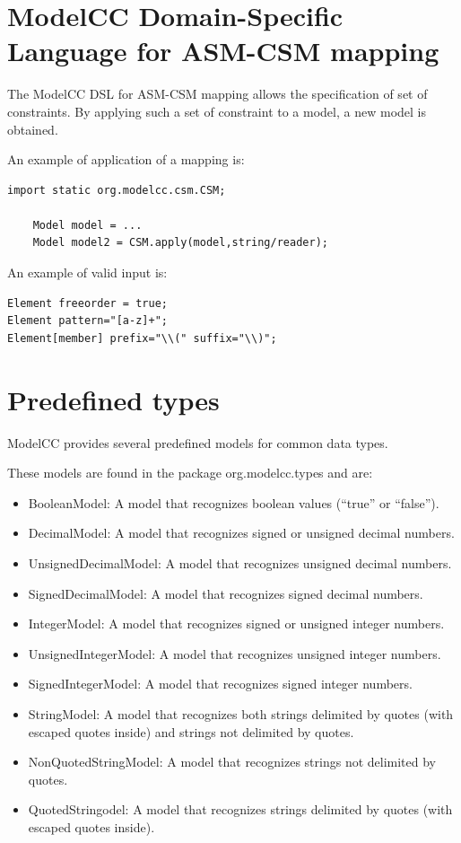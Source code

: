 \documentclass[a4paper,twoside,onecolumn]{article}
\newenvironment{colframe}{%
  \begin{Sbox} 
    \begin{minipage}{.8\columnwidth} 
}{%

  \end{minipage} 
  \end{Sbox} 
  \begin{center} 
    \fcolorbox{black}{MyGray}{\TheSbox} 
  \end{center} 
}
\begin{document}
\section{ModelCC Domain-Specific Language for ASM-CSM mapping} \label{sec:asmcsm}

The ModelCC DSL for ASM-CSM mapping allows the specification of set of constraints.
By applying such a set of constraint to a model, a new model is obtained.

An example of application of a mapping is:

\begin{colframe}
\begin{verbatim}
import static org.modelcc.csm.CSM;

    Model model = ...
    Model model2 = CSM.apply(model,string/reader);
\end{verbatim}
\end{colframe}

An example of valid input is:

\begin{colframe}
\begin{verbatim}
Element freeorder = true;
Element pattern="[a-z]+";
Element[member] prefix="\\(" suffix="\\)";
\end{verbatim}
\end{colframe}

\section{Predefined types} \label{sec:predefinedtypes}

ModelCC provides several predefined models for common data types.

These models are found in the package org.modelcc.types and are:

\begin{itemize}
\item BooleanModel: A model that recognizes boolean values (``true'' or ``false'').
\item DecimalModel: A model that recognizes signed or unsigned decimal numbers.
\item UnsignedDecimalModel: A model that recognizes unsigned decimal numbers.
\item SignedDecimalModel: A model that recognizes signed decimal numbers.
\item IntegerModel: A model that recognizes signed or unsigned integer numbers.
\item UnsignedIntegerModel: A model that recognizes unsigned integer numbers.
\item SignedIntegerModel: A model that recognizes signed integer numbers.
\item StringModel: A model that recognizes both strings delimited by quotes (with escaped quotes inside) and strings not delimited by quotes.
\item NonQuotedStringModel: A model that recognizes strings not delimited by quotes.
\item QuotedStringodel: A model that recognizes strings delimited by quotes (with escaped quotes inside).
\end{itemize}
\end{document}
